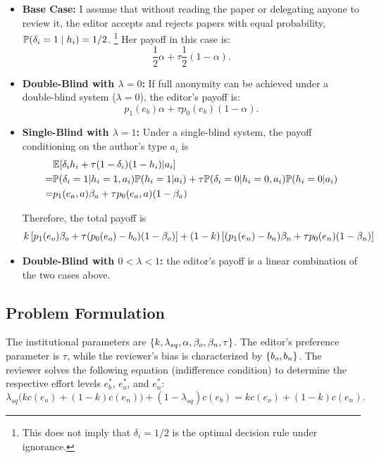 \documentclass[12pt]{article}
\begin{document}
\begin{itemize}
    \item \textbf{Base Case:}
          I assume that without reading the paper or delegating anyone to review it, the editor accepts and rejects papers with equal probability, $\mathbb{P}(\delta_i = 1 \mid h_i) = 1/2$.
          \footnote{This does not imply that $\delta_i = 1/2$ is the optimal decision rule under ignorance.}
          Her payoff in this case is:
          \[
              \frac{1}{2} \alpha + \tau \frac{1}{2} (1 - \alpha).
          \]

    \item \textbf{Double-Blind with $\lambda = 0$:}
          If full anonymity can be achieved under a double-blind system ($\lambda = 0$), the editor's payoff is:
          \[
              p_1(e_b) \alpha + \tau p_0(e_b) (1 - \alpha).
          \]

    \item \textbf{Single-Blind with $\lambda = 1$:}
          Under a single-blind system, the payoff conditioning on
          the author's type $a_i$ is
          \begin{equation*}
              \begin{split}
                    & \mathbb{E}[\delta_i h_i+\tau(1-\delta_i)(1-h_i)|a_i]                                    \\
                  = & \mathbb{P}(\delta_i=1|h_i=1,a_i)\mathbb{P}(h_i=1|a_i)+\tau\mathbb{P}(\delta_i=0|h_i=0,a_i)\mathbb{P}(h_i=0|a_i) \\
                  = & p_1(e_a,a)\beta_a+\tau p_0(e_a,a)(1-\beta_a)
              \end{split}
          \end{equation*}

          Therefore, the total payoff is
          \[k \left[p_1(e_o)\beta_o+\tau (p_0(e_o)-b_o)(1-\beta_o)\right]+(1-k)\left[(p_1(e_n)-b_n)\beta_n+\tau p_0(e_n)(1-\beta_n)\right]\]

    \item \textbf{Double-Blind with $0 < \lambda < 1$:} the editor's payoff is a linear combination of
          the two cases above.
\end{itemize}

\subsection{Problem Formulation}
The institutional parameters are $\left\{k, \lambda_{sq}, \alpha, \beta_o,
        \beta_n, \tau\right\}$. The editor's preference parameter is $\tau$, while the
reviewer's bias is characterized by $\left\{b_o, b_n\right\}$. The reviewer solves the
following equation (indifference condition) to determine the respective effort
levels $e_b^*$, $e_o^*$, and $e_n^*$:
\begin{equation}
    \lambda_{sq} \big(k c(e_o) + (1-k) c(e_n)\big) + (1-\lambda_{sq}) c(e_b) = k c(e_o) + (1-k) c(e_n).
\end{equation}
\end{document}
